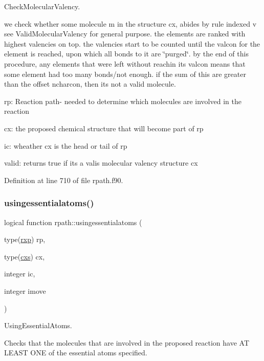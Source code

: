 Check\+Molecular\+Valency. 

we check whether some molecule m in the structure cx, abides by rule indexed v see Valid\+Molecular\+Valency for general purpose. the elements are ranked with highest valencies on top. the valencies start to be counted until the valcon for the element is reached, upon which all bonds to it are \char`\"{}purged\char`\"{}. by the end of this procedure, any elements that were left without reachin its valcon means that some element had too many bonds/not enough. if the sum of this are greater than the offset ncharcon, then its not a valid molecule.


\begin{DoxyItemize}
\item rp\+: Reaction path-\/ needed to determine which molecules are involved in the reaction
\item cx\+: the proposed chemical structure that will become part of rp
\item ic\+: wheather cx is the head or tail of rp
\item valid\+: returns true if its a valis molecular valency structure cx 
\end{DoxyItemize}

Definition at line 710 of file rpath.\+f90.

\mbox{\label{namespacerpath_a89f260bcfddda4d489828af14c2651e7}} 
\subsubsection{\texorpdfstring{usingessentialatoms()}{usingessentialatoms()}}
{\footnotesize\ttfamily logical function rpath\+::usingessentialatoms (\begin{DoxyParamCaption}\item[{type(\mbox{\hyperlink{structrpath_1_1rxp}{rxp}})}]{rp,  }\item[{type(\mbox{\hyperlink{structchemstr_1_1cxs}{cxs}})}]{cx,  }\item[{integer}]{ic,  }\item[{integer}]{imove }\end{DoxyParamCaption})}



Using\+Essential\+Atoms. 

Checks that the molecules that are involved in the proposed reaction have AT L\+E\+A\+ST O\+NE of the essential atoms specified.


